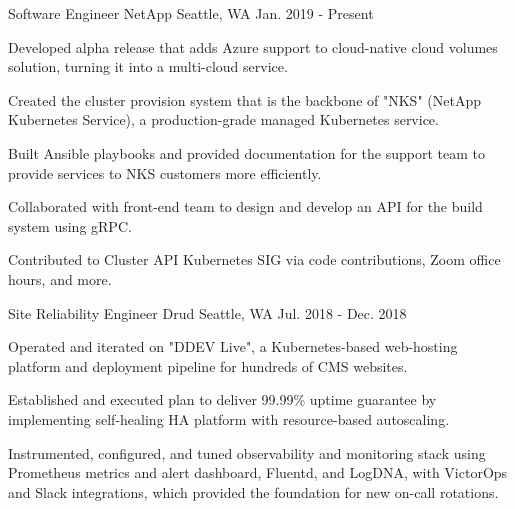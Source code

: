 


\begin{cventries}


\cventry
{Software Engineer} %
{NetApp} %
{Seattle, WA} %
{Jan. 2019 - Present} %
{ %
\begin{cvitems}
\item {Developed alpha release that adds Azure support to cloud-native cloud volumes solution, turning it into a multi-cloud service.}
\item {Created the cluster provision system that is the backbone of "NKS" (NetApp Kubernetes Service), a production-grade managed Kubernetes service.}
\item {Built Ansible playbooks and provided documentation for the support team to provide services to NKS customers more efficiently.}
\item {Collaborated with front-end team to design and develop an API for the build system using gRPC.}
\item {Contributed to Cluster API Kubernetes SIG via code contributions, Zoom office hours, and more.}
\end{cvitems}   
}



\cventry
{Site Reliability Engineer} %
{Drud} %
{Seattle, WA} %
{Jul. 2018 - Dec. 2018} %
{ %
\begin{cvitems}
\item {Operated and iterated on "DDEV Live", a Kubernetes-based web-hosting platform and deployment pipeline for hundreds of CMS websites.}
\item {Established and executed plan to deliver 99.99\% uptime guarantee by implementing self-healing HA platform with resource-based autoscaling.}
\item {Instrumented, configured, and tuned observability and monitoring stack using Prometheus metrics and alert dashboard, Fluentd, and LogDNA, with VictorOps and Slack integrations, which provided the foundation for new on-call rotations.}
\end{cvitems}
}


\end{cventries}
